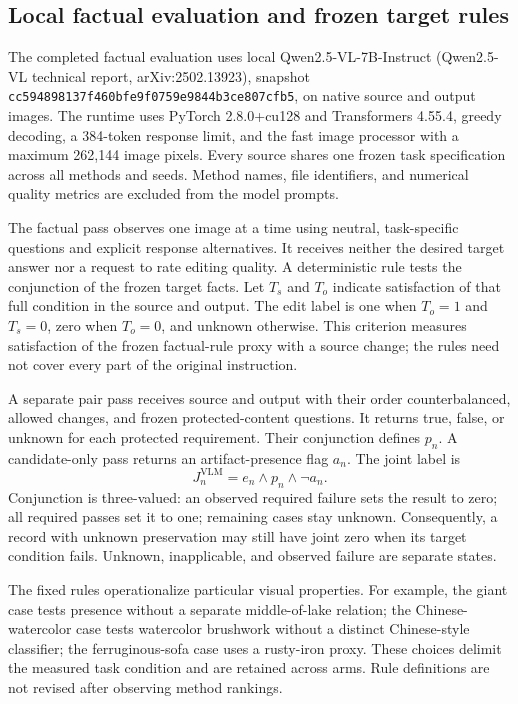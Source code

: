 \subsection{Local factual evaluation and frozen target rules}
\label{app:factual-v2}
The completed factual evaluation uses local Qwen2.5-VL-7B-Instruct (Qwen2.5-VL technical report, arXiv:2502.13923), snapshot \texttt{cc594898137f460bfe9f0759e9844b3ce807cfb5}, on native source and output images. The runtime uses PyTorch 2.8.0+cu128 and Transformers 4.55.4, greedy decoding, a 384-token response limit, and the fast image processor with a maximum 262,144 image pixels. Every source shares one frozen task specification across all methods and seeds. Method names, file identifiers, and numerical quality metrics are excluded from the model prompts.

The factual pass observes one image at a time using neutral, task-specific questions and explicit response alternatives. It receives neither the desired target answer nor a request to rate editing quality. A deterministic rule tests the conjunction of the frozen target facts. Let $T_s$ and $T_o$ indicate satisfaction of that full condition in the source and output. The edit label is one when $T_o=1$ and $T_s=0$, zero when $T_o=0$, and unknown otherwise. This criterion measures satisfaction of the frozen factual-rule proxy with a source change; the rules need not cover every part of the original instruction.

A separate pair pass receives source and output with their order counterbalanced, allowed changes, and frozen protected-content questions. It returns true, false, or unknown for each protected requirement. Their conjunction defines $p_n$. A candidate-only pass returns an artifact-presence flag $a_n$. The joint label is
\begin{equation}
J_n^{\mathrm{VLM}}=e_n\land p_n\land\neg a_n.
\label{eq:factual-joint}
\end{equation}
Conjunction is three-valued: an observed required failure sets the result to zero; all required passes set it to one; remaining cases stay unknown. Consequently, a record with unknown preservation may still have joint zero when its target condition fails. Unknown, inapplicable, and observed failure are separate states.

The fixed rules operationalize particular visual properties. For example, the giant case tests presence without a separate middle-of-lake relation; the Chinese-watercolor case tests watercolor brushwork without a distinct Chinese-style classifier; the ferruginous-sofa case uses a rusty-iron proxy. These choices delimit the measured task condition and are retained across arms. Rule definitions are not revised after observing method rankings.

